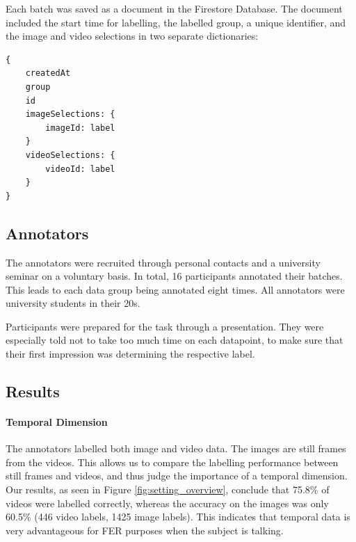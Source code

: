 Each batch was saved as a document in the Firestore Database. The document included the start time for labelling, the labelled group, a unique identifier, and the image and video selections in two separate dictionaries: 

\begin{lstlisting}[caption=Data structure of the Firestore document for each labelled batch.] 
{
    createdAt
    group
    id
    imageSelections: {
        imageId: label
    }
    videoSelections: {
        videoId: label
    }
}
\end{lstlisting}

\subsection{Annotators}
The annotators were recruited through personal contacts and a university seminar on a voluntary basis. In total, 16 participants annotated their batches. This leads to each data group being annotated eight times. All annotators were university students in their 20s.

Participants were prepared for the task through a presentation. They were especially told not to take too much time on each datapoint, to make sure that their first impression was determining the respective label.

\subsection{Results}

\paragraph{Temporal Dimension}
The annotators labelled both image and video data. The images are still frames from the videos. This allows us to compare the labelling performance between still frames and videos, and thus judge the importance of a temporal dimension. Our results, as seen in Figure \ref{fig:setting_overview}, conclude that 75.8\% of videos were labelled correctly, whereas the accuracy on the images was only 60.5\% (446 video labels, 1425 image labels). This indicates that temporal data is very advantageous for FER purposes when the subject is talking.


